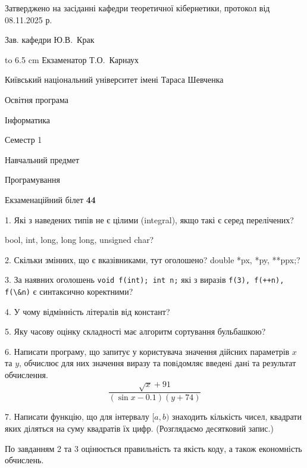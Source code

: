 \documentclass[12pt, ukrainian]{article}
\def\code#1{\Verb!#1!}
\begin{document}
{\smallskip\smallskip \begin {scriptsize} Затверджено на засіданні кафедри теоретичної кібернетики, протокол   від   08.11.2025 р.\par\smallskip\smallskip\smallskip\smallskip
{\parbox {6.5 cm} {Зав. кафедри \dotfill Ю.В.~Крак}}\hspace {0.7cm} {\hbox to 6.5 cm { Екзаменатор \dotfill Т.О.~Карнаух}} \end{scriptsize}}
\vspace{0.9cm}
{{\begin {scriptsize}\par
{ \center  Київський національний університет імені Тараса Шевченка \par}
{\parbox {5 cm}{Освітня програма \hfill}{\parbox {7 cm}{Інформатика\hfill}}\parbox {6 cm}{\hfill Семестр 1}}\par
{\parbox {5 cm} {Навчальний предмет \hfill}\parbox {7 cm}{Програмування \hfill}\parbox {6cm}{\hfill}\par}\vspace{-15pt} \end{scriptsize}}{\center Екзаменаційний білет \No \textbf { 44 }\par}}
{%
1. Які з наведених типів не є цілими (integral), якщо такі є серед перелічених?

bool, int, long, long long, unsigned char?
\par
\vspace{2mm}
2. Скільки змінних, що є вказівниками, тут оголошено?
double *px, *py, **ppx;?
\par
\vspace{2mm}
3. За наявних оголошень \code{void f(int); int n;} які з виразів \code{f(3), f(++n), f(\&n)} є синтаксично коректними?
\par
\vspace{2mm}
4. У чому відмінність літералів від констант?
\par
\vspace{2mm}
5. Яку часову оцінку складності має алгоритм сортування бульбашкою?
\par
\vspace{2mm}
6. Написати програму, що запитує у користувача значення дійсних параметрів $x$ та $y$, обчислює для них значення виразу та повiдомляє введенi данi та результат обчислення.
$$\frac{\sqrt x + 91}{(\sin x - 0.1) (y + 74)}$$ 

\par
7. Написати функцію, що для інтервалу $[a, b)$ знаходить кількість чисел, квадрати яких діляться на суму квадратів їх цифр. (Розглядаємо десятковий запис.)

По завданням 2 та 3 оцінюється правильність та якість коду, а також економність обчислень.

}
\end{document}
